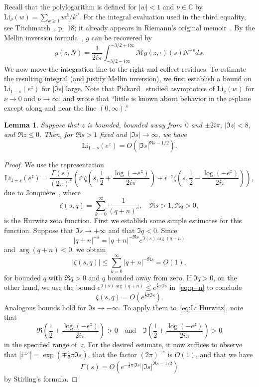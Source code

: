 \documentclass[a4paper]{amsart}
\newtheorem{lemma}[theorem]{Lemma}
\begin{document}
Recall that the polylogarithm is
defined for $|w|<1$  and $\nu\in\mathbb{C}$ by $\mathrm{Li}_\nu(w) = \sum_{k\geq1}w^k/k^\nu$.
For the integral evaluation used in the third equality,
see Titchmarsh~\cite{Ti86}, p.~18; it already appears in Riemann's
original memoir~\cite{Ri59}.
By the Mellin inversion formula~\cite{FlGoDu95},  $g$ can be recovered by
\begin{equation}\label{eq:g mell}
  g(z,N) = \frac{1}{2i\pi} \int_{-3/2-i\infty}^{-3/2+i \infty} \mathcal{M}g(z,\cdot)(s) N^{-s}ds.
\end{equation}
We now move the integration line to the right and collect residues.
To estimate the resulting integral (and justify Mellin inversion),
we first establish a bound on
$ \mathrm{Li}_{1-s}(e^z)$ for $|\Im s|$ large. Note that Pickard~\cite{Pi68}
studied asymptotics of $\mathrm{Li}_\nu(w)$ for $\nu\to0$ and $\nu\to\infty$,
and wrote that ``little is known about behavior in the $\nu$-plane
except along and near the line $(0,\infty)$.''
%
\begin{lemma}\label{le:Li}
  Suppose that $z$ is bounded, bounded away from~$0$ and $\pm 2i\pi$,
  $|\Im z|<8$, and $\Re z \leq 0$. Then,
  for $\Re s>1$ fixed and $|\Im s|\to\infty$, we have
  \[
     \mathrm{Li}_{1-s}(e^z) = O( |\Im s|^{\Re s -1/2}).
  \]
\end{lemma}
\begin{proof}
  We use the representation
  \begin{equation}\label{eq:Li Hurwitz}
    \mathrm{Li}_{1-s}(e^z) = \frac{\Gamma(s)}{(2\pi)^s}
      \left( i^s \zeta\left(s,\frac12 + \frac{\log(-e^z)}{2i\pi}\right)
      + i^{-s} \zeta\left(s,\frac12 - \frac{\log(-e^z)}{2i\pi}\right)\right),
  \end{equation}
  due to Jonqui{\`e}re~\cite{Jo89}, where
  \[
    \zeta(s,q) = \sum_{k=0}^\infty \frac{1}{(q+n)^s}, \quad \Re s >1, \Re q >0,
  \]
  is the Hurwitz zeta function. 
  First we establish some simple estimates for this function.
  Suppose that $\Im s \to +\infty$ and that $\Im q <0$. Since
  \begin{equation}\label{eq:q+n}
    |q+n|^{-s} = |q+n|^{-\Re s} e^{\Im(s) \arg(q+n)}
  \end{equation}
  and $\arg(q+n)<0$, we obtain
  \[
     |\zeta(s,q)| \leq \sum_{k=0}^\infty |q+n|^{-\Re s} = O(1),
  \]
  for bounded $q$ with $\Re q>0$ and $q$ bounded away from zero.
  If $\Im q >0$, on the other hand, we use the bound $e^{\Im(s) \arg(q+n)}
  \leq e^{\tfrac12 \pi \Im s}$ in~\eqref{eq:q+n} to conclude
  \[
     \zeta(s,q) = O(e^{\tfrac12 \pi \Im s}).
  \]
  Analogous bounds hold for $\Im s\to-\infty$. To apply them to~\eqref{eq:Li Hurwitz},
  note that
  \[
    \Re\left(\frac12 \pm \frac{\log(-e^z)}{2i\pi}\right)>0 \quad \text{and} \quad
    \Im\left(\frac12 + \frac{\log(-e^z)}{2i\pi}\right)>0
  \]
  in the specified range of~$z$.
  For the desired estimate, it now suffices to observe that
   $|i^{\pm s}|=\exp(\mp \tfrac12\pi
    \Im s)$, that the factor $(2\pi)^{-s}$ is $O(1)$, and that we have
  \[
    \Gamma(s) = O(e^{-\tfrac12 \pi |\Im s|} |\Im s|^{\Re s - 1/2})
  \]
  by Stirling's formula.
\end{proof}
\end{document}
